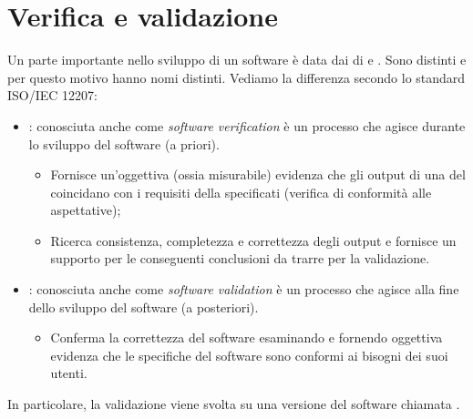 \documentclass[../main]{subfiles}
\begin{document}
\section{Verifica e validazione}
Un parte importante nello sviluppo di un  software è data dai  di  e . Sono  distinti e per questo motivo hanno nomi distinti. Vediamo la differenza secondo lo standard ISO/IEC 12207:
\begin{itemize}
    \item {}: conosciuta anche come \textit{software verification} è un processo che agisce durante lo sviluppo del software (a priori).
    \begin{itemize}
        \item Fornisce un'oggettiva (ossia misurabile) evidenza che gli output di una  del  coincidano con i requisiti della  specificati (verifica di conformità alle aspettative);
        \item Ricerca consistenza, completezza e correttezza degli output e fornisce un supporto per le conseguenti conclusioni da trarre per la validazione.
    \end{itemize}
    \item {}: conosciuta anche come \textit{software validation} è un processo che agisce alla fine dello sviluppo del software (a posteriori).
    \begin{itemize}
        \item Conferma la correttezza del software esaminando e fornendo oggettiva evidenza che le specifiche del software sono conformi ai bisogni dei suoi utenti.
    \end{itemize}
\end{itemize}
In particolare, la validazione viene svolta su una versione del software chiamata .
\end{document}
